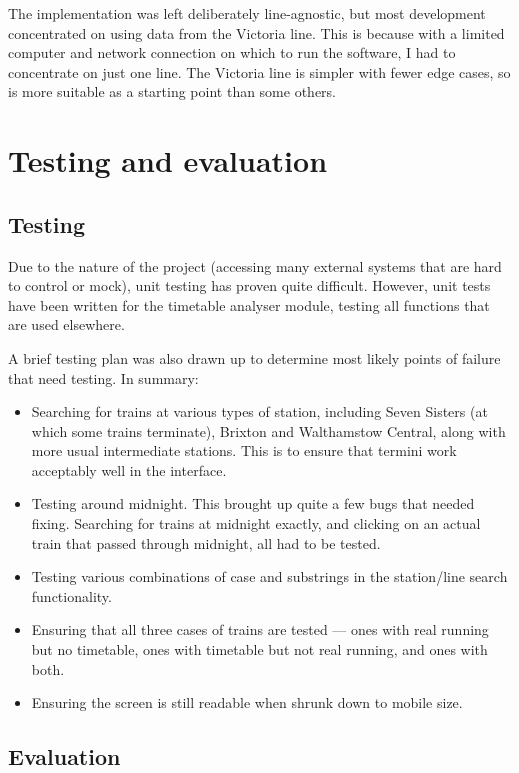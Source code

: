 \documentclass[a4paper,12pt,twoside]{report}
\begin{document}
The implementation was left deliberately line-agnostic, but most development
concentrated on using data from the Victoria line. This is because with a
limited computer and network connection on which to run the software, I had to
concentrate on just one line. The Victoria line is simpler with fewer edge
cases, so is more suitable as a starting point than some others.

\chapter{Testing and evaluation}

\section{Testing}

Due to the nature of the project (accessing many external systems that are hard
to control or mock), unit testing has proven quite difficult. However, unit
tests have been written for the timetable analyser module, testing all
functions that are used elsewhere.

A brief testing plan was also drawn up to determine most likely points of
failure that need testing. In summary:

\begin{itemize}
  \item Searching for trains at various types of station, including Seven
    Sisters (at which some trains terminate), Brixton and Walthamstow Central,
    along with more usual intermediate stations. This is to ensure that termini
    work acceptably well in the interface.
  \item Testing around midnight. This brought up quite a few bugs that needed
    fixing. Searching for trains at midnight exactly, and clicking on an actual
    train that passed through midnight, all had to be tested.
  \item Testing various combinations of case and substrings in the station/line
    search functionality.
  \item Ensuring that all three cases of trains are tested --- ones with real
    running but no timetable, ones with timetable but not real running, and
    ones with both.
  \item Ensuring the screen is still readable when shrunk down to mobile size.
\end{itemize}

\section{Evaluation}
\end{document}
